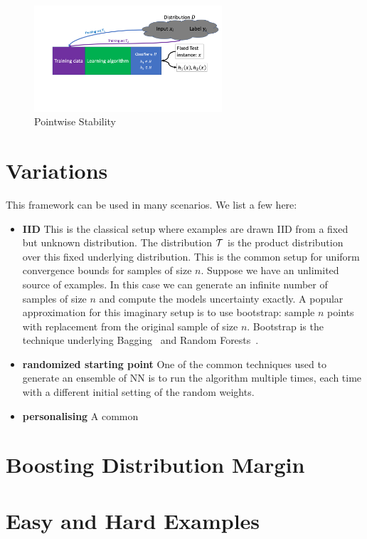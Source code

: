 \documentclass{article}
\begin{document}
\begin{figure}[h]
\begin{center}
\includegraphics[width=2.75in]{PPTFigures/Pointwise.png}
\end{center}
\caption{Pointwise Stability}
\label{fig:rationale}
\end{figure}
\fi

\section{Variations}
This framework can be used in many scenarios. We list a few here:
\begin{itemize}
    \item {\bf IID} This is the classical setup where examples are drawn IID from a fixed but unknown distribution. The distribution ${\cal T}$ is the product distribution over this fixed underlying distribution. This is the common setup for uniform convergence bounds for samples of size $n$. 
    Suppose we have an unlimited source of examples. In this case we can generate an infinite number of samples of size $n$ and compute the models uncertainty exactly.  A popular approximation for this imaginary setup is to use bootstrap: sample $n$ points with replacement from the original sample of size $n$. Bootstrap is the technique underlying Bagging~\cite{} and Random Forests~\cite{}.
    \item {\bf randomized starting point} One of the common techniques used to generate an ensemble of NN is to run the algorithm multiple times, each time with a different initial setting of the random weights.
    \item {\bf personalising} A common
\end{itemize}

\section{Boosting Distribution Margin}
\label{sec:boosting_distribution_margin}
\section{Easy and Hard Examples}
\label{sec:easy_ad_hard_examples}
\end{document}
